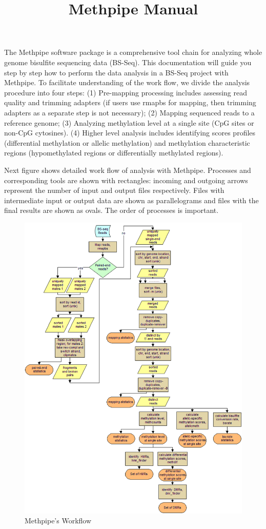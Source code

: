 \documentclass{article}
\title{Methpipe Manual}
\begin{document}
\maketitle
The Methpipe software package is a comprehensive tool chain for
analyzing whole genome bisulfite sequencing data (BS-Seq).  This
documentation will guide you step by step how to perform the
data analysis in a BS-Seq project with Methpipe. To facilitate
understanding of the work flow, we divide the analysis procedure into
four steps: (1) Pre-mapping processing includes assessing
read quality and  trimming adapters (if users use rmapbs for mapping, then 
trimming adapters as a separate step is not necessary); (2)
Mapping sequenced reads to a reference genome; (3)
Analyzing methylation level at a single site (CpG sites or
non-CpG cytosines). (4) Higher level analysis includes
identifying scores profiles (differential methylation or allelic methylation) 
and methylation characteristic regions (hypomethylated regions or 
differentially methylated regions). 

Next figure  shows detailed work flow of analysis with Methpipe.
Processes and corresponding tools are shown with rectangles: incoming and outgoing 
arrows represent the number of input and output files respectively.
Files with intermediate input or output data are shown as parallelograms
and files with the final results are shown as ovals.
The order of processes is important.
\begin{figure}[htbp]
  \centering
  \includegraphics[width=6.3in]{figs/Methpipe_work_flow.pdf}
  \caption{Methpipe's Workflow}
  \label{fig:workflow}
\end{figure}
 
\end{document}

